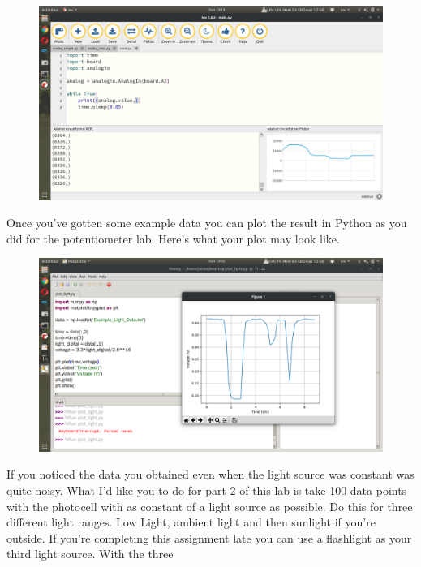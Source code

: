 \begin{figure}[H]
  \begin{center}
    \includegraphics[width=\textwidth]{Figures/photocell_mu.png}
  \end{center}
\end{figure}
Once you’ve gotten some example data you can plot the result in Python as you did for the potentiometer lab. Here’s what your plot may look like.
\begin{figure}[H]
  \begin{center}
    \includegraphics[width=\textwidth]{Figures/photocell_plots.png}
  \end{center}
\end{figure}
If you noticed the data you obtained even when the light source was
constant was quite noisy. What I’d like you to do for part 2 of this
lab is take 100 data points with the photocell with as constant of a
light source as possible. Do this for three different light
ranges. Low Light, ambient light and then sunlight if you're
outside. If you're completing this assignment late you can use a
flashlight as your third light source. With the three
